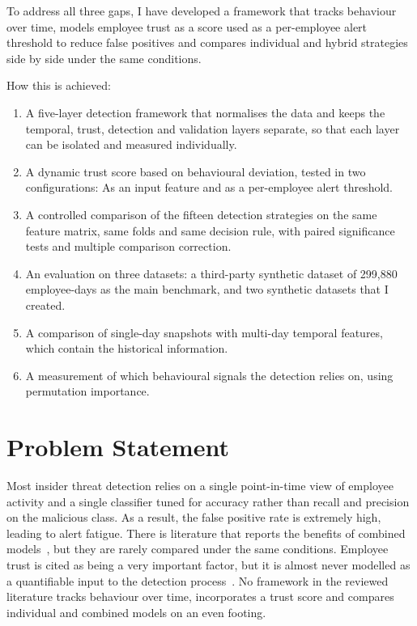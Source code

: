 \documentclass[a4paper,12pt]{article}
\begin{document}
To address all three gaps, I have developed a framework that tracks behaviour over time, models employee trust as a score used as a per-employee alert threshold to reduce false positives and compares individual and hybrid strategies side by side under the same conditions.

How this is achieved:

\begin{enumerate}
  \item A five-layer detection framework that normalises the data and keeps the temporal, trust, detection and validation layers separate, so that each layer can be isolated and measured individually.
  \item A dynamic trust score based on behavioural deviation, tested in two configurations: As an input feature and as a per-employee alert threshold.
  \item A controlled comparison of the fifteen detection strategies on the same feature matrix, same folds and same decision rule, with paired significance tests and multiple comparison correction.
  \item An evaluation on three datasets: a third-party synthetic dataset of 299,880 employee-days as the main benchmark, and two synthetic datasets that I created.
  \item A comparison of single-day snapshots with multi-day temporal features, which contain the historical information.
  \item A measurement of which behavioural signals the detection relies on, using permutation importance.
\end{enumerate}
\section{Problem Statement}
\label{sec:2}

Most insider threat detection relies on a single point-in-time view of employee activity and a single classifier tuned for accuracy rather than recall and precision on the malicious class. As a result, the false positive rate is extremely high, leading to alert fatigue. There is literature that reports the benefits of combined models~\cite{alzaabi2024}, but they are rarely compared under the same conditions. Employee trust is cited as being a very important factor, but it is almost never modelled as a quantifiable input to the detection process~\cite{liu2018}. No framework in the reviewed literature tracks behaviour over time, incorporates a trust score and compares individual and combined models on an even footing.
\end{document}
